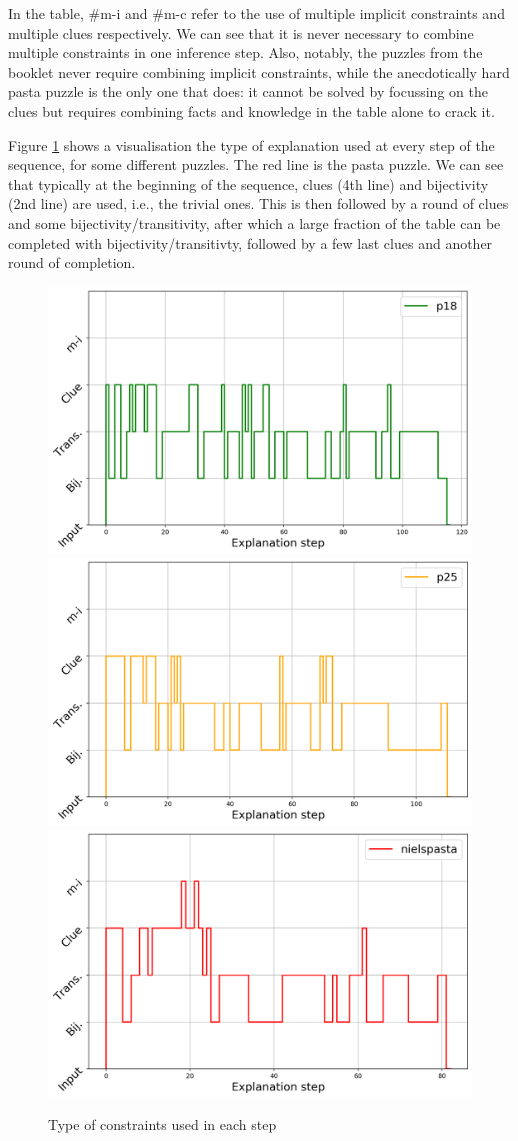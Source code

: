 In the table, \#m-i and \#m-c refer to the use of multiple implicit constraints and multiple clues respectively. We can see that it is never necessary to combine multiple constraints in one inference step. Also, notably, the puzzles from the booklet never require combining implicit constraints, while the anecdotically hard pasta puzzle is the only one that does: it cannot be solved by focussing on the clues but requires combining facts and knowledge in the table alone to crack it.


 Figure \ref{fig:steps} shows a visualisation the type of explanation used at every step of the sequence, for some different puzzles. The red line is the pasta puzzle. We can see that typically at the beginning of the sequence, clues (4th line) and bijectivity (2nd line) are used, i.e., the trivial ones. This is then followed by a round of clues and some bijectivity/transitivity, after which a large fraction of the table can be completed with bijectivity/transitivty, followed by a few last clues and another round of completion.\setlength{\parskip}{0pt}

\begin{figure}[H]
\centering
\includegraphics[width=0.32\linewidth]{figures/plot_cost_steps_p18}
\includegraphics[width=0.32\linewidth]{figures/plot_cost_steps_p25}
\includegraphics[width=0.32\linewidth]{figures/plot_cost_steps_nielspasta}\caption{Type of constraints used in each step}
\label{fig:steps}
\end{figure}

